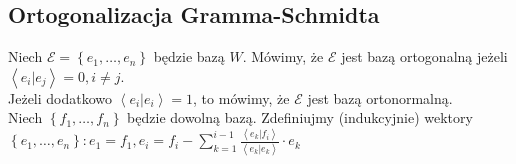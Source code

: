 \documentclass[../main.tex]{subfiles}
\begin{document}
\subsection{Ortogonalizacja Gramma-Schmidta}
Niech $\mathcal{E} = \left\{ e_1,\ldots,e_n \right\} $ będzie bazą $W$. Mówimy, że $\mathcal{E}$ jest bazą ortogonalną jeżeli $\left<e_i|e_j \right> = 0, i\neq j$.\\
Jeżeli dodatkowo $\left<e_i | e_i \right> = 1$, to mówimy, że $\mathcal{E}$ jest bazą ortonormalną.\\
Niech $\left\{ f_1,\ldots,f_n \right\} $ będzie dowolną bazą. Zdefiniujmy (indukcyjnie) wektory $\left\{ e_1,\ldots,e_n \right\}: e_1 = f_1, e_i = f_i - \sum_{k=1}^{i-1} \frac{\left<e_k|f_i \right>}{\left<e_k|e_k \right>}\cdot e_k$
\end{document}
